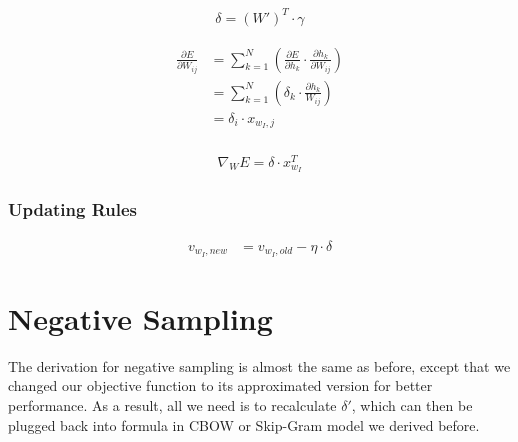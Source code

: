 \documentclass{article}
\begin{document}
	\begin{equation}
		\begin{aligned}
			\delta = (W')^T \cdot \gamma
		\end{aligned}
	\end{equation}
	
	\begin{equation}
		\begin{aligned}
			\frac{\partial E}{\partial W_{ij}} &= \sum_{k=1}^{N} \left( \frac{\partial E}{\partial h_k} \cdot \frac{\partial h_k}{\partial W_{ij}}\right) \\
			&= \sum_{k=1}^{N} \left( \delta_k \cdot \frac{\partial h_k}{W_{ij}}\right) \\
			&= \delta_i \cdot x_{w_I,j} \\
		\end{aligned}
	\end{equation}
	
	
	\begin{equation}
		\begin{aligned}
			\nabla_W E = \delta \cdot x_{w_I}^T
		\end{aligned}
	\end{equation}
	
	\subsubsection*{Updating Rules}
	\begin{framed}
	\begin{equation}
		\begin{aligned}
			v_{w_I, new} &= v_{w_I, old} - \eta \cdot \delta
		\end{aligned}
	\end{equation}
	\end{framed}
	
	\newpage
	\section{Negative Sampling}
	
The derivation for negative sampling is almost the same as before, except that we changed our objective function to its  approximated version for better performance. As a result, all we need is to recalculate $\delta'$, which can then be plugged back into formula in CBOW or Skip-Gram model we derived before.
\end{document}
